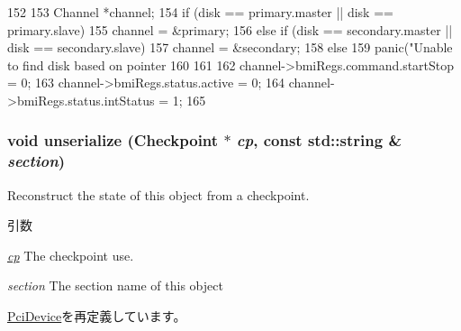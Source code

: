 \begin{DoxyCode}
152 {
153     Channel *channel;
154     if (disk == primary.master || disk == primary.slave) {
155         channel = &primary;
156     } else if (disk == secondary.master || disk == secondary.slave) {
157         channel = &secondary;
158     } else {
159         panic("Unable to find disk based on pointer %
160     }
161 
162     channel->bmiRegs.command.startStop = 0;
163     channel->bmiRegs.status.active = 0;
164     channel->bmiRegs.status.intStatus = 1;
165 }
\end{DoxyCode}
\hypertarget{classIdeController_af22e5d6d660b97db37003ac61ac4ee49}{
\subsubsection[{unserialize}]{\setlength{\rightskip}{0pt plus 5cm}void unserialize ({\bf Checkpoint} $\ast$ {\em cp}, \/  const std::string \& {\em section})}}
\label{classIdeController_af22e5d6d660b97db37003ac61ac4ee49}
Reconstruct the state of this object from a checkpoint. 
\begin{DoxyParams}{引数}
\item[{\em \hyperlink{namespacecp}{cp}}]The checkpoint use. \item[{\em section}]The section name of this object \end{DoxyParams}


\hyperlink{classPciDevice_af22e5d6d660b97db37003ac61ac4ee49}{PciDevice}を再定義しています。


